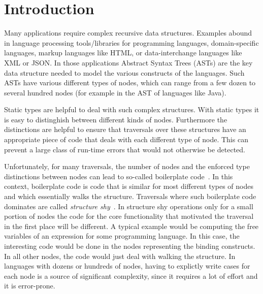\section{Introduction}

Many applications require complex recursive data structures. Examples
abound in language processing tools/libraries for programming
languages, domain-specific languages, markup languages like HTML, or
data-interchange languages like XML or JSON. In those applications
Abstract Syntax Trees (ASTs) are the key data structure needed to
model the various constructs of the languages. Such ASTs have various
different types of nodes, which can range from a few dozen to
several hundred nodes (for example in the AST of languages like Java).

Static types are helpful to deal with such complex structures.  With
static types it is easy to distinghish between different kinds of
nodes. Furthermore the distinctions are helpful to ensure that
traversals over these structures have an appropriate piece of code that
deals with each different type of node. This can prevent a large class
of run-time errors that would not otherwise be detected.


Unfortunately, for many traversals, the number of nodes and the
enforced type distinctions between nodes can lead to so-called
boilerplate code~\cite{}. In this context, boilerplate code is code
that is similar for most different types of nodes and which
essentially walks the structure. Traversals where such boilerplate
code dominates are called \emph{structure shy}~\cite{}. In structure shy
operations only for a small portion of nodes the code for the core
functionality that motivated the traversal in the first place will be
different. A typical example would be computing the free variables of
an expression for some programming language. In this case, the
interesting code would be done in the nodes representing the binding
constructs. In all other nodes, the code would just deal with
walking the structure. In languages with dozens or hundreds of nodes,
having to explictly write cases for each node is a source of
significant complexity, since it requires a lot of effort and it is
error-prone.

